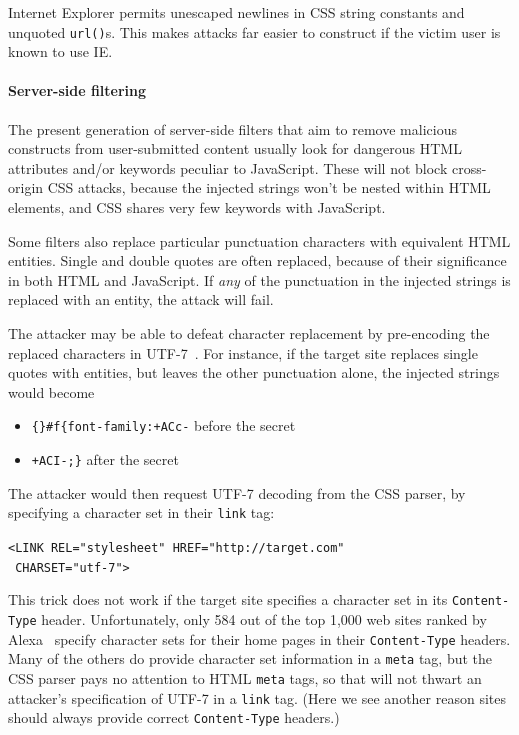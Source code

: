 \documentclass{acm_proc_article-sp}
\begin{document}
Internet Explorer permits unescaped newlines in CSS string constants
and unquoted \texttt{url()}s.  This makes attacks far easier to
construct if the victim user is known to use IE.

\paragraph{Server-side filtering}
The present generation of server-side filters that aim to remove
malicious constructs from user-submitted content usually look for
dangerous HTML attributes and/or keywords peculiar to JavaScript.
These will not block cross-origin CSS attacks, because the injected
strings won't be nested within HTML elements, and CSS shares very few
keywords with JavaScript.

Some filters also replace particular punctuation characters with
equivalent HTML entities.  Single and double quotes are often
replaced, because of their significance in both HTML and JavaScript.
If \emph{any} of the punctuation in the injected strings is replaced
with an entity, the attack will fail.

The attacker may be able to defeat character replacement by
pre-encoding the replaced characters in UTF-7~\cite{utf7}.  For
instance, if the target site replaces single quotes with entities, but
leaves the other punctuation alone, the injected strings would become
\begin{itemize}
\item \verb|{}#f{font-family:+ACc-| before the secret
\item \verb|+ACI-;}| after the secret
\end{itemize}
The attacker would then request UTF-7 decoding from the CSS parser,
by specifying a character set in their \verb|link| tag:

\verb|<LINK REL="stylesheet" HREF="http://target.com"|\\
\verb| CHARSET="utf-7">|

This trick does not work if the target site specifies a character set
in its \texttt{Content-Type} header.  Unfortunately, only 584 out of
the top 1,000 web sites ranked by Alexa~\cite{alexa} specify character
sets for their home pages in their \texttt{Content-Type} headers.
Many of the others do provide character set information in a
\verb|meta| tag, but the CSS parser pays no attention to HTML
\verb|meta| tags, so that will not thwart an attacker's specification
of UTF-7 in a \verb|link| tag.  (Here we see another reason sites
should always provide correct \texttt{Content-Type} headers.)
\end{document}
